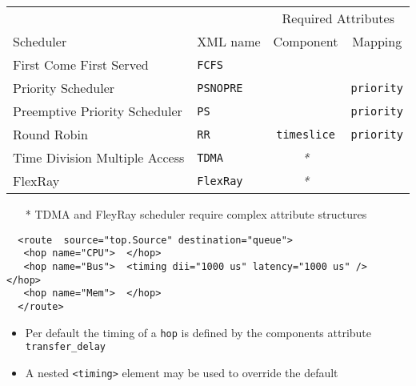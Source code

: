 \begin{frame}[fragile=singleslide]
\begin{tabular}{llcc}
\toprule
&& \multicolumn{2}{c}{Required Attributes} \\
\cmidrule(r){3-4}
Scheduler & XML name & Component & Mapping \\
\midrule
First Come First Served      & \lstinline!FCFS!    & &  \\
Priority Scheduler           & \lstinline!PSNOPRE! & & \lstinline!priority! \\
Preemptive Priority Scheduler& \lstinline!PS!      & & \lstinline!priority! \\
Round Robin                  & \lstinline!RR! & \lstinline!timeslice! & \lstinline!priority!  \\
Time Division Multiple Access& \lstinline!TDMA!    & \emph{*} & \\
FlexRay                      & \lstinline!FlexRay! & \emph{*} & \\
\bottomrule
\end{tabular}

\begin{itemize}
\item[*] TDMA and FleyRay scheduler require complex attribute structures
\end{itemize}
\end{frame}


\begin{frame}[fragile=singleslide]
\begin{lstlisting}
  <route  source="top.Source" destination="queue">
   <hop name="CPU">  </hop>
   <hop name="Bus">  <timing dii="1000 us" latency="1000 us" />  </hop>
   <hop name="Mem">  </hop>
  </route>
\end{lstlisting}
\begin{itemize}
\item Per default the timing of a \lstinline!hop! is defined by the components attribute \lstinline!transfer_delay!
\item A nested \lstinline!<timing>! element may be used to override the default
\end{itemize}
\end{frame}


